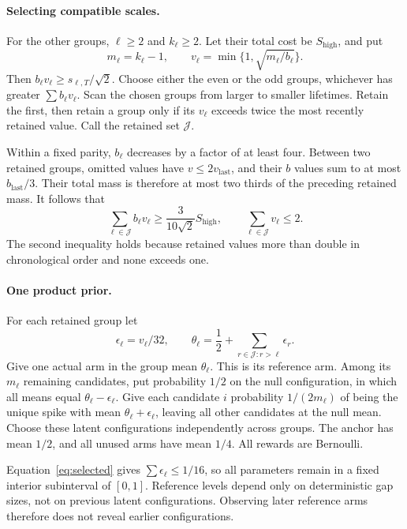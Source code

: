 \paragraph{Selecting compatible scales.}
For the other groups, $\ell\ge2$ and $k_\ell\ge2$. Let their total cost be $S_{\mathrm{high}}$, and put
\[
 m_\ell=k_\ell-1,\qquad v_\ell=\min\{1,\sqrt{m_\ell/b_\ell}\}.
\]
Then $b_\ell v_\ell\ge s_{\ell,T}/\sqrt2$. Choose either the even or the odd groups, whichever has greater $\sum b_\ell v_\ell$. Scan the chosen groups from larger to smaller lifetimes. Retain the first, then retain a group only if its $v_\ell$ exceeds twice the most recently retained value. Call the retained set $\mathcal J$.

Within a fixed parity, $b_\ell$ decreases by a factor of at least four. Between two retained groups, omitted values have $v\le2v_{\mathrm{last}}$, and their $b$ values sum to at most $b_{\mathrm{last}}/3$. Their total mass is therefore at most two thirds of the preceding retained mass. It follows that
\begin{equation}\label{eq:selected}
 \sum_{\ell\in\mathcal J}b_\ell v_\ell\ge\frac3{10\sqrt2}S_{\mathrm{high}},
 \qquad \sum_{\ell\in\mathcal J}v_\ell\le2.
\end{equation}
The second inequality holds because retained values more than double in chronological order and none exceeds one.

\paragraph{One product prior.}
For each retained group let
\[
 \epsilon_\ell=v_\ell/32,\qquad
 \theta_\ell=\frac12+\sum_{r\in\mathcal J:r>\ell}\epsilon_r.
\]
Give one actual arm in the group mean $\theta_\ell$. This is its reference arm. Among its $m_\ell$ remaining candidates, put probability $1/2$ on the null configuration, in which all means equal $\theta_\ell-\epsilon_\ell$. Give each candidate $i$ probability $1/(2m_\ell)$ of being the unique spike with mean $\theta_\ell+\epsilon_\ell$, leaving all other candidates at the null mean. Choose these latent configurations independently across groups. The anchor has mean $1/2$, and all unused arms have mean $1/4$. All rewards are Bernoulli.

Equation~\eqref{eq:selected} gives $\sum\epsilon_\ell\le1/16$, so all parameters remain in a fixed interior subinterval of $[0,1]$. Reference levels depend only on deterministic gap sizes, not on previous latent configurations. Observing later reference arms therefore does not reveal earlier configurations.

